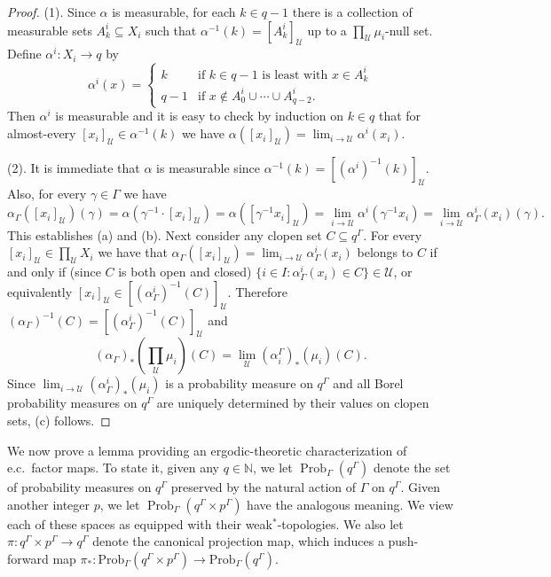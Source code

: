 \documentclass[12pt]{amsart}
\theoremstyle{definition}
\def\bb{\mathbb}
\def\bb{\mathbb}
\def\u{\mathsf 1}
\def \u{\mathcal U}
\newcommand{\Prob}{\mathrm{Prob}}
\begin{document}
\begin{proof}
	(1). Since $\alpha$ is measurable, for each $k \in q-1$ there is a collection of measurable sets $A_k^i \subseteq X_i$ such that $\alpha^{-1}(k) = [A_k^i]_\u$ up to a $\prod_\u \mu_i$-null set. Define $\alpha^i : X_i \rightarrow q$ by
	$$\alpha^i(x) = \begin{cases}
		k & \text{if } k \in q-1 \text{ is least with } x \in A_k^i\\
		q-1 & \text{if } x \not\in A_0^i \cup \cdots \cup A_{q-2}^i.
	\end{cases}$$
	Then $\alpha^i$ is measurable and it is easy to check by induction on $k \in q$ that for almost-every $[x_i]_\u \in \alpha^{-1}(k)$ we have $\alpha([x_i]_\u) = \lim_{i \rightarrow \u} \alpha^i(x_i)$.
	
	(2). It is immediate that $\alpha$ is measurable since $\alpha^{-1}(k) = [(\alpha^i)^{-1}(k)]_\u$. Also, for every $\gamma \in \Gamma$ we have
	$$\alpha_\Gamma([x_i]_\u)(\gamma) = \alpha(\gamma^{-1} \cdot [x_i]_\u) = \alpha([\gamma^{-1} x_i]_\u) = \lim_{i \rightarrow \u} \alpha^i(\gamma^{-1} x_i) = \lim_{i \rightarrow \u} \alpha^i_\Gamma(x_i)(\gamma).$$
	This establishes (a) and (b). Next consider any clopen set $C \subseteq q^\Gamma$. For every $[x_i]_\u \in \prod_\u X_i$ we have that $\alpha_\Gamma([x_i]_\u) = \lim_{i \rightarrow \u} \alpha^i_\Gamma(x_i)$ belongs to $C$ if and only if (since $C$ is both open and closed) $\{i \in I : \alpha^i_\Gamma(x_i) \in C\} \in \u$, or equivalently $[x_i]_\u \in [(\alpha^i_\Gamma)^{-1}(C)]_\u$. Therefore $(\alpha_\Gamma)^{-1}(C) = [(\alpha^i_\Gamma)^{-1}(C)]_\u$ and
	$$(\alpha_\Gamma)_*(\prod_\u \mu_i)(C) = \lim_\u (\alpha_i^\Gamma)_*(\mu_i)(C).$$
	Since $\lim_{i \rightarrow \u} (\alpha_\Gamma^i)_*(\mu_i)$ is a probability measure on $q^\Gamma$ and all Borel probability measures on $q^\Gamma$ are uniquely determined by their values on clopen sets, (c) follows.
\end{proof}

We now prove a lemma providing an ergodic-theoretic characterization of e.c.\ factor maps.  To state it, given any $q\in \bb N$, we let $\operatorname{Prob}_\Gamma(q^\Gamma)$ denote the set of probability measures on $q^\Gamma$ preserved by the natural action of $\Gamma$ on $q^\Gamma$.  Given another integer $p$, we let $\operatorname{Prob}_\Gamma(q^\Gamma\times p^\Gamma)$ have the analogous meaning.  We view each of these spaces as equipped with their weak$^*$-topologies.  We also let $\pi:q^\Gamma\times p^\Gamma\to q^\Gamma$ denote the canonical projection map, which induces a push-forward map $\pi_*:\Prob_\Gamma(q^\Gamma \times p^\Gamma)\to \Prob_\Gamma(q^\Gamma)$. 
\end{document}
